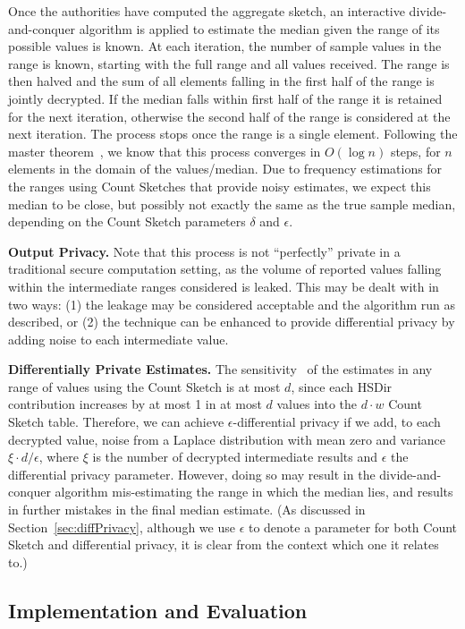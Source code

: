 \documentclass[conference]{IEEEtran}
\newcommand{\descr}[1]{\medskip \noindent \textbf{#1}}
\newcommand{\BigO}[1]{\ensuremath{O(#1)}}
\begin{document}
Once the authorities have computed the aggregate sketch, an interactive divide-and-conquer algorithm is applied to estimate the median given the range of its possible values is known. At each iteration, the number of sample values in the range is known, starting with the full range and all values received. The range is then halved and the sum of all elements falling in the first half of the range is jointly decrypted. If the median falls within first half of the range it is retained for the next iteration, otherwise the second half of the range is considered at the next iteration. The process stops once the range is a single element. 
Following the master theorem~\cite{cormen2001introduction}, we know that this process converges in $\BigO{\log n}$ steps, for $n$  elements in the domain of the values/median. Due to frequency estimations for the ranges using Count Sketches that provide noisy estimates, we expect this median to be close, but possibly not exactly the same as the true sample median, depending on the Count Sketch parameters $\delta$ and $\epsilon$.

\descr{Output Privacy.} Note that this process is not ``perfectly'' private in a traditional secure computation setting, as the volume of reported values falling within the intermediate ranges considered is leaked. This may be dealt with in two ways: (1) the leakage may be considered acceptable and the algorithm run as described, or (2) the technique can be enhanced to provide differential privacy by adding noise to each intermediate value.

\descr{Differentially Private Estimates.} The sensitivity~\cite{dwork2006calibrating} of the estimates in any range of values using the Count Sketch is at most $d$, since each HSDir contribution increases by at most 1 in at most $d$ values into the $d \cdot w$ Count Sketch table. Therefore, we can achieve $\epsilon$-differential privacy if we add, to each decrypted value, noise from a Laplace distribution with mean zero and variance $\xi \cdot d / \epsilon$, where $\xi$ is the number of decrypted intermediate results and $\epsilon$ the differential privacy parameter. However, doing so may result in the divide-and-conquer algorithm mis-estimating the range in which the median lies, and results in further mistakes in the final median estimate. (As discussed in Section~\ref{sec:diffPrivacy}, although we use $\epsilon$
to denote a parameter for both Count Sketch and differential privacy, it is clear from the context which one it relates to.)

\subsection{Implementation and Evaluation}
\end{document}

